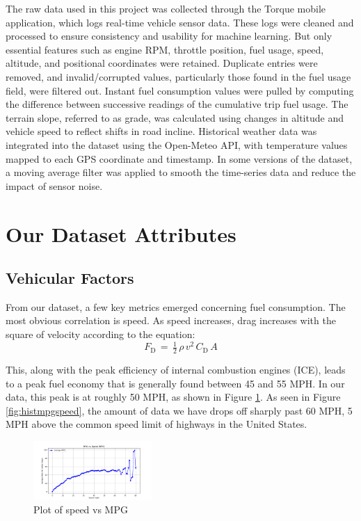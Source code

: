 \documentclass[letterpaper]{article}
\begin{document}
The raw data used in this project was collected through the Torque mobile 
application, which logs real-time vehicle sensor data. These logs were 
cleaned and processed to ensure consistency and usability for machine 
learning. But only essential features such as engine RPM, throttle 
position, fuel usage, speed, altitude, and positional coordinates were 
retained. Duplicate entries were removed, and invalid/corrupted values, 
particularly those found in the fuel usage field, were filtered out. 
Instant fuel consumption values were pulled by computing the difference 
between successive readings of the cumulative trip fuel usage. The 
terrain slope, referred to as grade, was calculated using changes in 
altitude and vehicle speed to reflect shifts in road incline. 
Historical weather data was integrated into the dataset using the 
Open-Meteo API, with temperature values mapped to each GPS coordinate 
and timestamp. In some versions of the dataset, a moving average filter 
was applied to smooth the time-series data and reduce the impact of sensor 
noise.

\section*{Our Dataset Attributes}

\subsection*{Vehicular Factors}

From our dataset, a few key metrics emerged concerning fuel consumption. 
The most obvious correlation is speed. As speed increases, drag increases 
with the square of velocity according to the equation: 
\[
    \displaystyle F_{\mathrm {D} }\,=\,{\tfrac {1}{2}}\,\rho \,v^{2}\,C_{\mathrm {D} }\,A
\] 

This, along with the peak efficiency of internal combustion engines (ICE), 
leads to a peak fuel economy that is generally found between 45 and 55 MPH. 
In our data, this peak is at roughly 50 MPH, as shown in Figure \ref{fig:mpgspeed}. 
As seen in Figure \ref{fig:histmpgspeed}, the amount of data we have drops off sharply 
past 60 MPH, 5 MPH above the common speed limit of highways in the United 
States.

\begin{figure}[htbp]
    \centering
    \includegraphics[width=0.4\textwidth]{figures/speed_vs_mpg.png}
    \caption{Plot of speed vs MPG}
    \label{fig:mpgspeed}
\end{figure}
\end{document}
